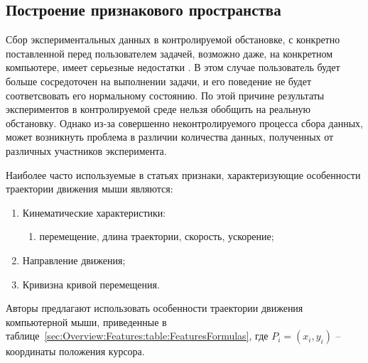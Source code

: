 \documentclass[12pt]{article}
\begin{document}
    \subsection{Построение признакового пространства}
    \label{sec:Overview:Features}

    \par Сбор экспериментальных данных в контролируемой обстановке, с конкретно поставленной перед пользователем задачей, возможно даже, на конкретном компьютере, имеет серьезные недостатки \cite{Shen}. В этом случае пользователь будет больше сосредоточен на выполнении задачи, и его поведение не будет соответсвовать его нормальному состоянию. По этой причине результаты экспериментов в контролируемой среде нельзя обобщить на реальную обстановку. Однако из-за совершенно неконтролируемого процесса сбора данных, может возникнуть проблема в различии количества данных, полученных от различных участников эксперимента.

    \par Наиболее часто используемые в статьях признаки, характеризующие особенности траектории движения мыши являются:

    \begin{enumerate}
        \item Кинематические характеристики:
        \begin{enumerate}
            \item перемещение, длина траектории, скорость, ускорение;
        \end{enumerate}
        \item Направление движения;
        \item Кривизна кривой перемещения.
    \end{enumerate}

    \par Авторы \cite{Mondal} предлагают использовать особенности траектории движения компьютерной мыши, приведенные в таблице~\ref{sec:Overview:Features:table:FeaturesFormulas}, где $P_i = (x_i, y_i)$ -- координаты положения курсора.
\end{document}
